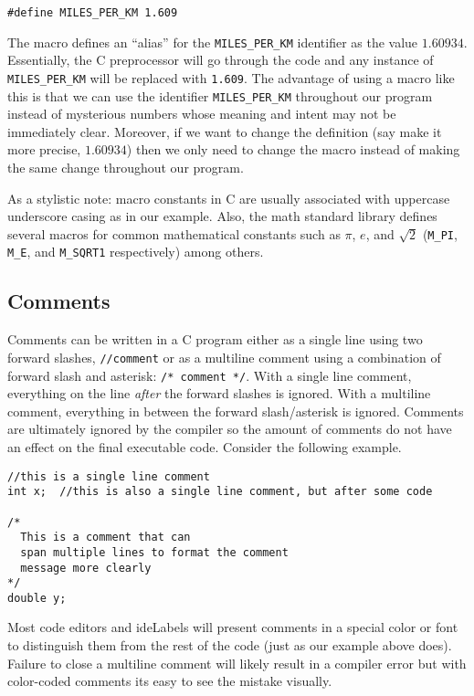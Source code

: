 \begin{verbatim}
#define MILES_PER_KM 1.609
\end{verbatim}

The macro defines an ``alias'' for the \texttt{MILES_PER_KM} identifier as the
value $1.60934$.  Essentially, the C preprocessor will go through the code and any
instance of \texttt{MILES_PER_KM} will be replaced with \texttt{1.609}.
The advantage of using a macro like this is that we can use the identifier \texttt{MILES_PER_KM}
throughout our program instead of mysterious numbers whose meaning and intent
may not be immediately clear.  Moreover, if we want to change the definition (say make it more
precise, $1.60934$) then we only need to change the macro instead of making the
same change throughout our program.

As a stylistic note: macro constants in C are usually associated with uppercase 
underscore casing as in our example.  Also, the math standard library defines several
macros for common mathematical constants such as $\pi$, $e$, and $\sqrt{2}$ 
(\texttt{M_PI}, \texttt{M_E}, and \texttt{M_SQRT1} 
respectively) among others.

\subsection{Comments}

Comments can be written in a C program either as a single line using
two forward slashes, \texttt{//comment} or as a multiline comment using
a combination of forward slash and asterisk: \texttt{/* comment */}.  
With a single line comment, everything on the line \emph{after} the forward
slashes is ignored.  With a multiline comment, everything in between the forward
slash/asterisk is ignored.  Comments are ultimately ignored by the compiler so
the amount of comments do not have an effect on the final executable code.
Consider the following example.

\begin{verbatim}
//this is a single line comment
int x;  //this is also a single line comment, but after some code

/*
  This is a comment that can 
  span multiple lines to format the comment
  message more clearly
*/
double y;
\end{verbatim}

Most code editors and \glspl{ideLabel} will present comments in a special color or
font to distinguish them from the rest of the code (just as our example above does).
Failure to close a multiline comment will likely result in a compiler error but with
color-coded comments its easy to see the mistake visually.

